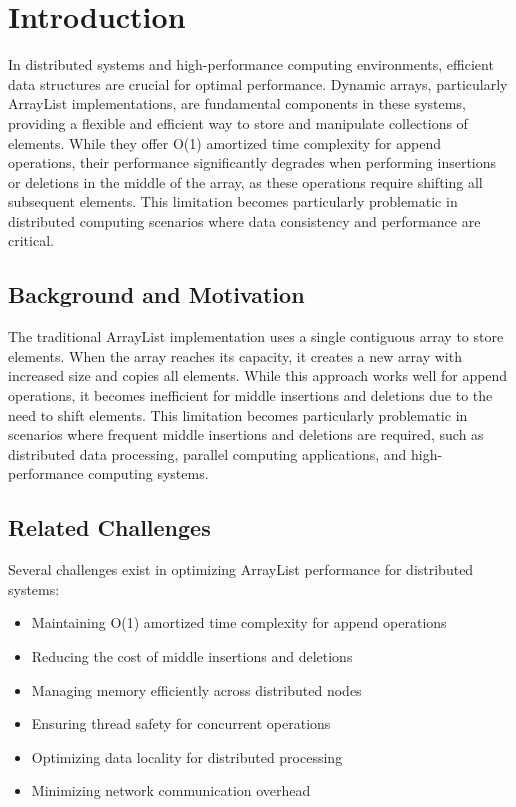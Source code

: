 \section{Introduction}

In distributed systems and high-performance computing environments, efficient data structures are crucial for optimal performance. Dynamic arrays, particularly ArrayList implementations, are fundamental components in these systems, providing a flexible and efficient way to store and manipulate collections of elements. While they offer O(1) amortized time complexity for append operations, their performance significantly degrades when performing insertions or deletions in the middle of the array, as these operations require shifting all subsequent elements. This limitation becomes particularly problematic in distributed computing scenarios where data consistency and performance are critical.

\subsection{Background and Motivation}

The traditional ArrayList implementation uses a single contiguous array to store elements. When the array reaches its capacity, it creates a new array with increased size and copies all elements. While this approach works well for append operations, it becomes inefficient for middle insertions and deletions due to the need to shift elements. This limitation becomes particularly problematic in scenarios where frequent middle insertions and deletions are required, such as distributed data processing, parallel computing applications, and high-performance computing systems.

\subsection{Related Challenges}

Several challenges exist in optimizing ArrayList performance for distributed systems:
\begin{itemize}
    \item Maintaining O(1) amortized time complexity for append operations
    \item Reducing the cost of middle insertions and deletions
    \item Managing memory efficiently across distributed nodes
    \item Ensuring thread safety for concurrent operations
    \item Optimizing data locality for distributed processing
    \item Minimizing network communication overhead
\end{itemize}

